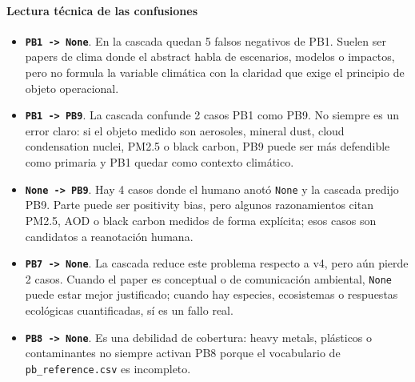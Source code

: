 \paragraph{Lectura técnica de las confusiones}

\begin{itemize}
\item \textbf{\texttt{PB1 -> None}}. En la cascada quedan 5 falsos negativos de PB1. Suelen ser papers de clima donde el abstract habla de escenarios, modelos o impactos, pero no formula la variable climática con la claridad que exige el principio de objeto operacional.
\item \textbf{\texttt{PB1 -> PB9}}. La cascada confunde 2 casos PB1 como PB9. No siempre es un error claro: si el objeto medido son aerosoles, mineral dust, cloud condensation nuclei, PM2.5 o black carbon, PB9 puede ser más defendible como primaria y PB1 quedar como contexto climático.
\item \textbf{\texttt{None -> PB9}}. Hay 4 casos donde el humano anotó \texttt{None} y la cascada predijo PB9. Parte puede ser positivity bias, pero algunos razonamientos citan PM2.5, AOD o black carbon medidos de forma explícita; esos casos son candidatos a reanotación humana.
\item \textbf{\texttt{PB7 -> None}}. La cascada reduce este problema respecto a v4, pero aún pierde 2 casos. Cuando el paper es conceptual o de comunicación ambiental, \texttt{None} puede estar mejor justificado; cuando hay especies, ecosistemas o respuestas ecológicas cuantificadas, sí es un fallo real.
\item \textbf{\texttt{PB8 -> None}}. Es una debilidad de cobertura: heavy metals, plásticos o contaminantes no siempre activan PB8 porque el vocabulario de \texttt{pb\_reference.csv} es incompleto.
\end{itemize}

